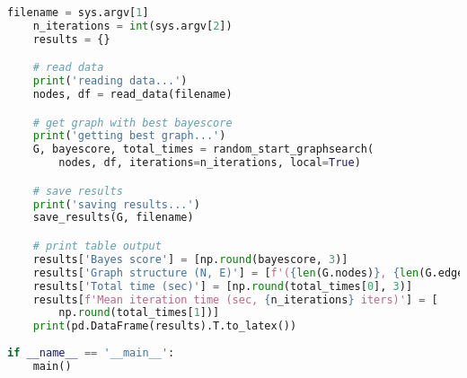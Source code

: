 \documentclass[twoside,11pt]{article}
\begin{document}
\begin{algorithm}
\begin{small}
\begin{lstlisting}[language=Python]
    filename = sys.argv[1]
    n_iterations = int(sys.argv[2])
    results = {}

    # read data
    print('reading data...')
    nodes, df = read_data(filename)

    # get graph with best bayescore
    print('getting best graph...')
    G, bayescore, total_times = random_start_graphsearch(
        nodes, df, iterations=n_iterations, local=True)

    # save results
    print('saving results...')
    save_results(G, filename)

    # print table output
    results['Bayes score'] = [np.round(bayescore, 3)]
    results['Graph structure (N, E)'] = [f'({len(G.nodes)}, {len(G.edges)})']
    results['Total time (sec)'] = [np.round(total_times[0], 3)]
    results[f'Mean iteration time (sec, {n_iterations} iters)'] = [
        np.round(total_times[1])]
    print(pd.DataFrame(results).T.to_latex())
    
if __name__ == '__main__':
    main()

\end{lstlisting}
\end{small}
\end{algorithm}
\end{document}
